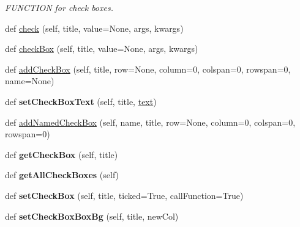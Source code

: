 \begin{DoxyCompactItemize}
\begin{DoxyCompactList}\small\item\em F\+U\+N\+C\+T\+I\+ON for check boxes. \end{DoxyCompactList}\item 
def \hyperlink{class_python_01_g_u_i_1_1appjar_1_1gui_a43194199f09702458bf7a01b1fb6585d}{check} (self, title, value=None, args, kwargs)
\item 
def \hyperlink{class_python_01_g_u_i_1_1appjar_1_1gui_a6c76a3964eb53768a4c095ee46996b01}{check\+Box} (self, title, value=None, args, kwargs)
\item 
def \hyperlink{class_python_01_g_u_i_1_1appjar_1_1gui_a3ff3e39fe6eb3d563f8cfd4bd8299903}{add\+Check\+Box} (self, title, row=None, column=0, colspan=0, rowspan=0, name=None)
\item 
\mbox{\label{class_python_01_g_u_i_1_1appjar_1_1gui_a94c1c5fc849d5da2b353f46ab76e5c39}} 
def {\bfseries set\+Check\+Box\+Text} (self, title, \hyperlink{class_python_01_g_u_i_1_1appjar_1_1gui_a6a060ddfec169e464326a0dd179a559e}{text})
\item 
def \hyperlink{class_python_01_g_u_i_1_1appjar_1_1gui_a4a85a0ce251111a1200b99fade4799a8}{add\+Named\+Check\+Box} (self, name, title, row=None, column=0, colspan=0, rowspan=0)
\item 
\mbox{\label{class_python_01_g_u_i_1_1appjar_1_1gui_a60e67fd19adb7ae69b8fd3edbde007a7}} 
def {\bfseries get\+Check\+Box} (self, title)
\item 
\mbox{\label{class_python_01_g_u_i_1_1appjar_1_1gui_abfc1e8e1e9b07db16504160c333d16b7}} 
def {\bfseries get\+All\+Check\+Boxes} (self)
\item 
\mbox{\label{class_python_01_g_u_i_1_1appjar_1_1gui_aa4610ef752b311f0d577d0f7ce399fc6}} 
def {\bfseries set\+Check\+Box} (self, title, ticked=True, call\+Function=True)
\item 
\mbox{\label{class_python_01_g_u_i_1_1appjar_1_1gui_ad58c88c0ad61ba99df97549d1b63e2b2}} 
def {\bfseries set\+Check\+Box\+Box\+Bg} (self, title, new\+Col)
\item 
\mbox{\label{class_python_01_g_u_i_1_1appjar_1_1gui_a64acec1a814e0512309a1d7b898cec4f}} 

\end{DoxyCompactItemize}
